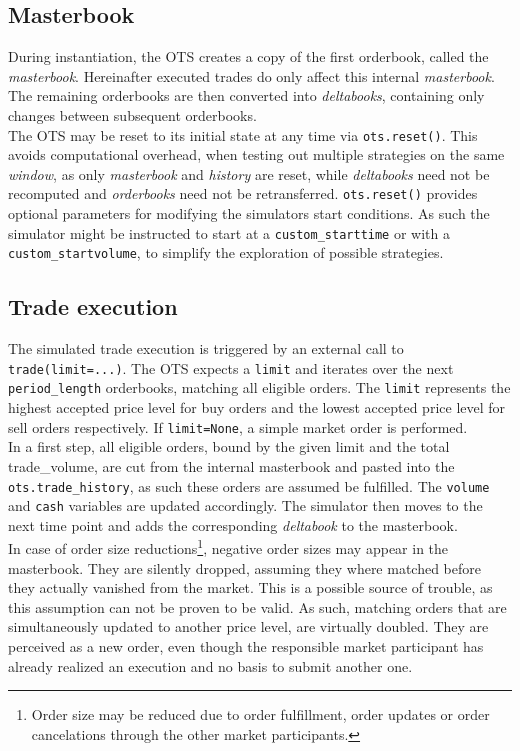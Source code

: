 \subsection{Masterbook}
During instantiation, the \ac{OTS} creates a copy of the first orderbook, called the \emph{masterbook}. Hereinafter executed trades do only affect this internal \emph{masterbook}. The remaining orderbooks are then converted into \emph{deltabooks}, containing only changes between subsequent orderbooks.\\

The \ac{OTS} may be reset to its initial state at any time via \lstinline!ots.reset()!. This avoids computational overhead, when testing out multiple strategies on the same \emph{window}, as only \emph{masterbook} and \emph{history} are reset, while \emph{deltabooks} need not be recomputed and \emph{orderbooks} need not be retransferred. \lstinline!ots.reset()! provides optional parameters for modifying the simulators start conditions. As such the simulator might be instructed to start at a \lstinline!custom_starttime! or with a \lstinline!custom_startvolume!, to simplify the exploration of possible strategies.

\subsection{Trade execution}
\label{chap:tradeexecution}
The simulated trade execution is triggered by an external call to \lstinline!trade(limit=...)!. The \ac{OTS} expects a \lstinline!limit! and iterates over the next \lstinline!period_length! orderbooks, matching all eligible orders. The \lstinline!limit! represents the highest accepted price level for buy orders and the lowest accepted price level for sell orders respectively. If \lstinline!limit=None!, a simple market order is performed.\\

In a first step, all eligible orders, bound by the given limit and the total trade\_volume, are cut from the internal masterbook and pasted into the \lstinline!ots.trade_history!, as such these orders are assumed be fulfilled. The \lstinline!volume! and \lstinline!cash! variables are updated accordingly.
The simulator then moves to the next time point and adds the corresponding \emph{deltabook} to the masterbook.\\

In case of order size reductions\footnote{Order size may be reduced due to order fulfillment, order updates or order cancelations through the other market participants.}, negative order sizes may appear in the masterbook. They are silently dropped, assuming they where matched before they actually vanished from the market. This is a possible source of trouble, as this assumption can not be proven to be valid. As such, matching orders that are simultaneously updated to another price level, are virtually doubled. They are perceived as a new order, even though the responsible market participant has already realized an execution and no basis to submit another one.\\

